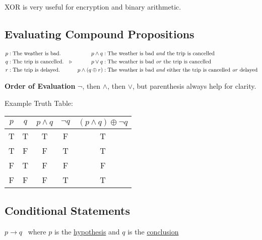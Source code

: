 \documentclass{article}
\begin{document}
XOR is very useful for encryption and binary arithmetic.

\subsection{Evaluating Compound Propositions}

\begin{align*}
  p & : \text{The weather is bad.}    &                &  & p \land q            & : \text{The weather is bad \textit{and} the trip is cancelled}                            \\
  q & : \text{The trip is cancelled.} & \triangleright &  & p \lor q             & : \text{The weather is bad \textit{or} the trip is cancelled}                             \\
  r & : \text{The trip is delayed.}   &                &  & p \land (q \oplus r) & : \text{The weather is bad \textit{and} either the trip is cancelled \textit{or} delayed} \\
\end{align*}

\textbf{Order of Evaluation} \(\lnot\), then \(\land\), then \(\lor\), but parenthesis always help for clarity.

\begin{center}
  Example Truth Table:
  \qquad
  \begin{tabular}{c|c|c|c|c}
    \(p\) & \(q\) & \(p \land q\) & \(\lnot q\) & \((p \land q) \oplus \lnot q\) \\
    \hline
    T     & T     & T             & F           & T                              \\
    T     & F     & F             & T           & T                              \\
    F     & T     & F             & F           & F                              \\
    F     & F     & F             & T           & T                              \\
  \end{tabular}
\end{center}

\subsection{Conditional Statements}

\begin{center}
  \(p \rightarrow q\) \ where \(p\) is the \underline{hypothesis} and \(q\) is the \underline{conclusion}
\end{center}
\end{document}

